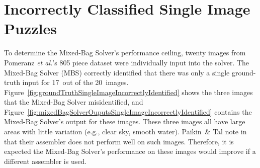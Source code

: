 \chapter{Incorrectly Classified Single Image Puzzles}\label{chap:incorreclyClassifiedSingleImages}

To determine the Mixed-Bag Solver's performance ceiling, twenty images from Pomeranz \textit{et al.}'s 805 piece dataset were individually input into the solver.  The Mixed-Bag Solver (MBS) correctly identified that there was only a single ground-truth input for 17~out of the 20~images.  Figure~\ref{fig:groundTruthSingleImageIncorrectlyIdentified} shows the three images that the Mixed-Bag Solver misidentified, and Figure~\ref{fig:mixedBagSolverOuputsSingleImageIncorrectlyIdentified} contains the Mixed-Bag Solver's output for these images.  These three images all have large areas with little variation (e.g., clear sky, smooth water).  Paikin~\& Tal note in~\cite{paikin2015} that their assembler does not perform well on such images.  Therefore, it is expected the Mixed-Bag Solver's performance on these images would improve if a different assembler is used.

